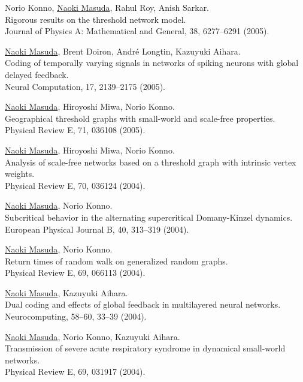 \documentclass[11pt,letter]{article}
\begin{document}
\begin{etaremune}
\item Norio Konno, \underline{Naoki Masuda}, Rahul Roy, Anish Sarkar.\\
Rigorous results on the threshold network model.\\
Journal of Physics A: Mathematical and General, 38, 6277--6291 (2005).

\item \underline{Naoki Masuda}, Brent Doiron, Andr\'{e} Longtin, Kazuyuki Aihara.\\
Coding of temporally varying signals in networks of spiking neurons with global delayed feedback.\\
Neural Computation, 17, 2139--2175 (2005).

\item \underline{Naoki Masuda}, Hiroyoshi Miwa, Norio Konno.\\
Geographical threshold graphs with small-world and scale-free properties.\\
Physical Review E, 71, 036108 (2005).

\item \underline{Naoki Masuda}, Hiroyoshi Miwa, Norio Konno.\\
Analysis of scale-free networks based on a threshold graph with intrinsic vertex weights.\\
Physical Review E, 70, 036124 (2004).

\item \underline{Naoki Masuda}, Norio Konno.\\
Subcritical behavior in the alternating supercritical Domany-Kinzel dynamics.\\
European Physical Journal B, 40, 313--319 (2004).

\item \underline{Naoki Masuda}, Norio Konno.\\
Return times of random walk on generalized random graphs.\\
Physical Review E, 69, 066113 (2004).

\item \underline{Naoki Masuda}, Kazuyuki Aihara.\\
Dual coding and effects of global feedback in multilayered neural networks.\\
Neurocomputing, 58--60, 33--39 (2004).

\item \underline{Naoki Masuda}, Norio Konno, Kazuyuki Aihara.\\
Transmission of severe acute respiratory syndrome in dynamical small-world networks.\\
Physical Review E, 69, 031917 (2004).


\end{etaremune}
\end{document}
